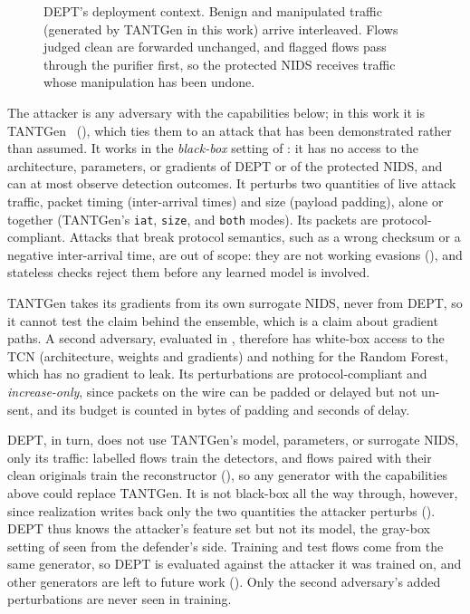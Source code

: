 \begin{figure}[htbp]
    \centering
    
    \caption[DEPT's deployment context.]{DEPT's deployment context. Benign and
    manipulated traffic (generated by TANTGen in this work) arrive interleaved. Flows
    judged clean are forwarded unchanged, and flagged flows pass through the purifier
    first, so the protected NIDS receives traffic whose manipulation has been undone.}
    \label{fig:sol-context}
\end{figure}

The attacker is any adversary with the capabilities below; in this work it is
TANTGen~\cite{pissarra2026tantgen} (), which ties them to an
attack that has been demonstrated rather than assumed.
It works in the \emph{black-box} setting of : it has no
access to the architecture, parameters, or gradients of DEPT or of the protected
\ac{NIDS}, and can at most observe detection outcomes. It perturbs two quantities of
live attack traffic, packet timing (inter-arrival times) and size (payload padding),
alone or together (TANTGen's \texttt{iat}, \texttt{size}, and \texttt{both} modes). Its
packets are protocol-compliant. Attacks that break protocol semantics, such as a
wrong checksum or a negative inter-arrival time, are out of scope: they are not working
evasions (), and stateless checks reject them before any
learned model is involved.

TANTGen takes its gradients from its own surrogate \ac{NIDS}, never from DEPT, so it
cannot test the claim behind the ensemble, which is a claim about gradient paths. A
second adversary, evaluated in , therefore has white-box
access to the \ac{TCN} (architecture, weights and gradients) and nothing for the Random
Forest, which has no gradient to leak. Its perturbations are protocol-compliant and
\emph{increase-only}, since packets on the wire can be padded or delayed but not
un-sent, and its budget is counted in bytes of padding and seconds of delay.

DEPT, in turn, does not use TANTGen's model, parameters, or surrogate \ac{NIDS}, only
its traffic: labelled flows train the detectors, and flows paired with their clean
originals train the reconstructor (), so any generator with
the capabilities above could replace TANTGen. It is not black-box all the way through,
however, since realization writes back only the two quantities the attacker perturbs
(). DEPT thus knows the
attacker's feature set but not its model, the gray-box setting of
 seen from the defender's side. Training and test flows
come from the same generator, so DEPT is evaluated against the attacker it was trained
on, and other generators are left to future work (). Only the
second adversary's added perturbations are never seen in training.

